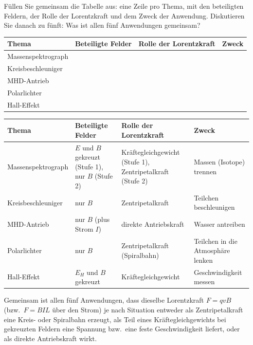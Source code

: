 \documentclass[addpoints,11pt,a4paper]{exam}
\begin{document}
\needspace{12cm}
\begin{questions}
\setcounter{question}{7}
\begin{groupbox}
\question[4] Füllen Sie gemeinsam die Tabelle aus: eine Zeile pro Thema,
mit den beteiligten Feldern, der Rolle der Lorentzkraft und dem Zweck der
Anwendung. Diskutieren Sie danach zu fünft: Was ist allen fünf Anwendungen
gemeinsam?
\begin{center}
\small
\begin{tabularx}{\textwidth}{@{}P{3.2cm}P{2.9cm}P{3.7cm}Y@{}}
\toprule
\textbf{Thema} & \textbf{Beteiligte Felder} & \textbf{Rolle der Lorentzkraft} & \textbf{Zweck} \\
\midrule
Massenspektrograph & & & \\[1.4cm]
Kreisbeschleuniger & & & \\[1.4cm]
MHD-Antrieb & & & \\[1.4cm]
Polarlichter & & & \\[1.4cm]
Hall-Effekt & & & \\[1.4cm]
\bottomrule
\end{tabularx}
\end{center}
\begin{solution}
\begin{center}
\small
\begin{tabularx}{\textwidth}{@{}P{3.2cm}P{2.9cm}P{3.7cm}Y@{}}
\toprule
\textbf{Thema} & \textbf{Beteiligte Felder} & \textbf{Rolle der Lorentzkraft} & \textbf{Zweck} \\
\midrule
Massenspektrograph & $E$ und $B$ gekreuzt (Stufe 1), nur $B$ (Stufe 2) &
Kräftegleichgewicht (Stufe 1), Zentripetalkraft (Stufe 2) & Massen (Isotope)
trennen \\[0.3cm]
Kreisbeschleuniger & nur $B$ & Zentripetalkraft & Teilchen beschleunigen \\[0.3cm]
MHD-Antrieb & nur $B$ (plus Strom $I$) & direkte Antriebskraft & Wasser
antreiben \\[0.3cm]
Polarlichter & nur $B$ & Zentripetalkraft (Spiralbahn) & Teilchen in die
Atmosphäre lenken \\[0.3cm]
Hall-Effekt & $E_H$ und $B$ gekreuzt & Kräftegleichgewicht &
Geschwindigkeit messen \\
\bottomrule
\end{tabularx}
\end{center}

Gemeinsam ist allen fünf Anwendungen, dass dieselbe Lorentzkraft $F=qvB$
(bzw.\ $F=BIL$ über den Strom) je nach Situation entweder als
Zentripetalkraft eine Kreis- oder Spiralbahn erzeugt, als Teil eines
Kräftegleichgewichts bei gekreuzten Feldern eine Spannung bzw.\ eine feste
Geschwindigkeit liefert, oder als direkte Antriebskraft wirkt.
\end{solution}
\end{groupbox}
\end{questions}
\end{document}
